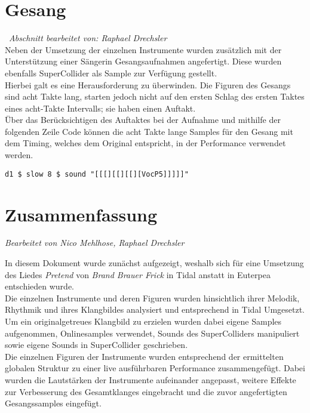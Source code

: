 \documentclass[
10pt, %
a4paper, %
oneside, %
headinclude,footinclude, %
BCOR5mm, %
]{scrartcl}
\begin{document}
\section{Gesang}\
\textit{Abschnitt bearbeitet von: Raphael Drechsler}\\

\noindent Neben der Umsetzung der einzelnen Instrumente wurden zusätzlich mit der Unterstützung einer Sängerin Gesangsaufnahmen angefertigt. Diese wurden ebenfalls SuperCollider als Sample zur Verfügung gestellt.\\
Hierbei galt es eine Herausforderung zu überwinden. Die Figuren des Gesangs sind acht Takte lang, starten jedoch nicht auf den ersten Schlag des ersten Taktes eines acht-Takte Intervalls; sie haben einen Auftakt.\\ Über das Berücksichtigen des Auftaktes bei der Aufnahme und mithilfe der folgenden Zeile Code können die acht Takte lange Samples für den Gesang mit dem Timing, welches dem Original entspricht, in der Performance verwendet werden.


\begin{lstlisting}
d1 $ slow 8 $ sound "[[[][[][[][VocP5]]]]]"
\end{lstlisting}

\section{Zusammenfassung}
\textit{Bearbeitet von Nico Mehlhose, Raphael Drechsler}

\noindent In diesem Dokument wurde zunächst aufgezeigt, weshalb sich für eine Umsetzung des Liedes \textit{Pretend} von \textit{Brand Brauer Frick} in Tidal anstatt in Euterpea entschieden wurde.\\ 
Die einzelnen Instrumente und deren Figuren wurden hinsichtlich ihrer Melodik, Rhythmik und ihres Klangbildes analysiert und entsprechend in Tidal Umgesetzt. Um ein originalgetreues Klangbild zu erzielen wurden dabei eigene Samples aufgenommen, Onlinesamples verwendet,  Sounds des SuperColliders manipuliert sowie eigene Sounds in SuperCollider geschrieben.\\
Die einzelnen Figuren der Instrumente wurden entsprechend der ermittelten globalen Struktur zu einer live ausführbaren Performance zusammengefügt. Dabei wurden die Lautstärken der Instrumente aufeinander angepasst, weitere Effekte zur Verbesserung des Gesamtklanges eingebracht und die zuvor angefertigten Gesangssamples eingefügt.\\
\end{document}
